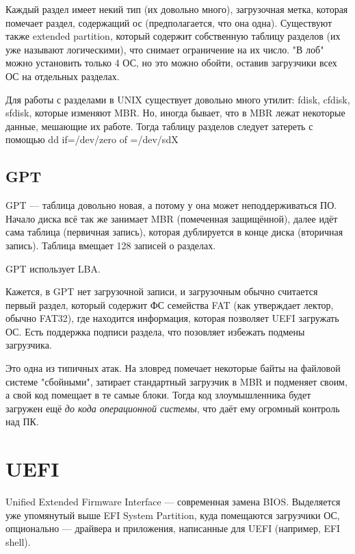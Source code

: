 \documentclass[main]{subfiles}
\begin{document}
Каждый раздел имеет некий тип (их довольно много), загрузочная метка, которая
помечает раздел, содержащий ос (предполагается, что она одна).
Существуют также extended partition, который содержит собственную таблицу
разделов (их уже называют логическими), что снимает ограничение на их число.
"В лоб" можно установить только 4 ОС, но это можно обойти, оставив загрузчики
всех ОС на отдельных разделах.

Для работы с разделами в UNIX существует довольно много утилит:
fdisk, cfdisk, sfdisk, которые изменяют MBR. Но, иногда бывает, что
в MBR лежат некоторые данные, мешающие их работе. Тогда таблицу
разделов следует затереть с помощью dd if=/dev/zero of =/dev/sdX 

\subsection{GPT}
GPT --- таблица довольно новая, а потому у она может неподдерживаться ПО.
Начало диска всё так же занимает MBR (помеченная защищённой), далее
идёт сама таблица (первичная запись), которая дублируется в конце диска
(вторичная запись). Таблица вмещает 128 записей о разделах.

GPT использует LBA.

Кажется, в GPT нет загрузочной записи, и загрузочным обычно считается
первый раздел, который содержит ФС семейства FAT (как утверждает лектор,
обычно FAT32), где находится информация, которая
позволяет UEFI загружать ОС. Есть поддержка подписи раздела, что позовляет
избежать подмены загрузчика.

Это одна из типичных атак. На зловред помечает некоторые байты на файловой
системе "сбойными", затирает стандартный загрузчик в MBR и подменяет своим,
а свой код помещает в те самые блоки. Тогда код злоумышленника будет загружен
ещё \emph{до кода операционной системы}, что даёт ему огромный контроль над ПК.

\section{UEFI}
Unified Extended Firmware Interface --- современная замена BIOS.
Выделяется уже упомянутый выше EFI System Partition, куда помещаются
загрузчики ОС, опционально --- драйвера и приложения, написанные для
UEFI (например, EFI shell).
\end{document}

